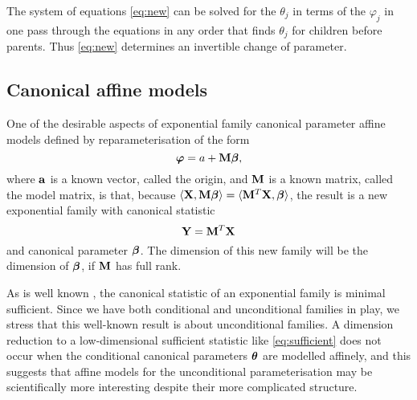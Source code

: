 The system of equations \eqref{eq:new} can be solved for the $\theta_j$
in terms of the $\varphi_j$ in one pass through the equations in any order
that finds $\theta_j$ for children before parents.  Thus \eqref{eq:new}
determines an invertible change of parameter.

\subsection{Canonical affine models} \label{sec:sufficient}

One of the desirable aspects of exponential
family canonical parameter affine models defined by reparameterisation of the form
\begin{equation} \label{eq:M-beta}
   {\boldsymbol{\varphi}} = a + \mathbf{M} {\boldsymbol{\beta}},
\end{equation}
where $\mathbf{a}$ is a known vector, called the origin,
and $\mathbf{M}$ is a known matrix, called the model matrix, is that,
because
$\langle \mathbf{X}, \mathbf{M} {\boldsymbol{\beta}} \rangle = \langle \mathbf{M}^T \mathbf{X}, {\boldsymbol{\beta}} \rangle$,
the result is a new exponential family
with canonical statistic
\begin{equation} \label{eq:sufficient}
   \mathbf{Y} = \mathbf{M}^T \mathbf{X}
\end{equation}
and canonical parameter ${\boldsymbol{\beta}}$.
The dimension of this new family will be the dimension of ${\boldsymbol{\beta}}$,
if
$\mathbf{M}$ has full rank.


As is well known \citep[p.~111]{barndorff}, the canonical statistic
of an exponential family is minimal sufficient.
Since we have both conditional and unconditional
families in play, we stress that this well-known result is about
unconditional families.
A dimension reduction to a low-dimensional sufficient statistic
like \eqref{eq:sufficient} does not occur when the conditional canonical
parameters ${\boldsymbol{\theta}}$ are modelled affinely,
and this suggests that affine models for the
unconditional parameterisation may be scientifically more interesting
despite their more complicated structure.

